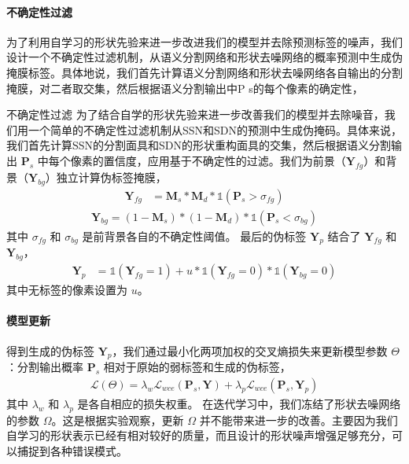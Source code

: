 \paragraph{不确定性过滤}
为了利用自学习的形状先验来进一步改进我们的模型并去除预测标签的噪声，我们设计一个不确定性过滤机制，从语义分割网络和形状去噪网络的概率预测中生成伪掩膜标签。具体地说，我们首先计算语义分割网络和形状去噪网络各自输出的分割掩膜，对二者取交集，然后根据语义分割输出中P s的每个像素的确定性，

不确定性过滤 为了结合自学的形状先验来进一步改善我们的模型并去除噪音，我们用一个简单的不确定性过滤机制从SSN和SDN的预测中生成伪掩码。具体来说，我们首先计算SSN的分割面具和SDN的形状重构面具的交集，然后根据语义分割输出 $\mathbf{P}_s$ 中每个像素的置信度，应用基于不确定性的过滤。我们为前景（$\mathbf{Y}_{fg}$）和背景（$\mathbf{Y}_{bg}$）独立计算伪标签掩膜，
\begin{align}   \label{eq1}
    \mathbf{Y}_{fg} &= \mathbf{M}_s * \mathbf{M}_d * \mathds{1} (\mathbf{P}_s > \sigma_{fg})
\end{align}
\begin{align}   \label{eq2}
    \mathbf{Y}_{bg} = (1-\mathbf{M}_s) * (1-\mathbf{M}_d) * \mathds{1} (\mathbf{P}_s < \sigma_{bg})
\end{align}
其中 $\sigma_{fg}$ 和 $\sigma_{bg}$ 是前背景各自的不确定性阈值。
最后的伪标签 $\mathbf{Y}_p$ 结合了 $\mathbf{Y}_{fg}$ 和 $\mathbf{Y}_{bg}$，
\begin{align}
    \mathbf{Y}_p &= \mathds{1}(\mathbf{Y}_{fg} = 1) + u * \mathds{1}(\mathbf{Y}_{fg} = 0) * \mathds{1}(\mathbf{Y}_{bg} = 0)
\end{align}
其中无标签的像素设置为 $u$。

\paragraph{模型更新}
得到生成的伪标签 $\mathbf{Y}_p$，我们通过最小化两项加权的交叉熵损失来更新模型参数 $\Theta$ ：分割输出概率 $\mathbf{P}_s$ 相对于原始的弱标签和生成的伪标签，
\begin{align} \label{eq3}
    \mathcal{L} (\Theta) = \lambda_w \mathcal{L}_{wce} (\mathbf{P}_s, \mathbf{Y}) + \lambda_p \mathcal{L}_{wce} (\mathbf{P}_s, \mathbf{Y}_p)
\end{align}
其中 $\lambda_w$ 和 $\lambda_p$ 是各自相应的损失权重。
在迭代学习中，我们冻结了形状去噪网络的参数 $\Omega$。这是根据实验观察，更新 $\Omega$ 并不能带来进一步的改善。主要因为我们自学习的形状表示已经有相对较好的质量，而且设计的形状噪声增强足够充分，可以捕捉到各种错误模式。


